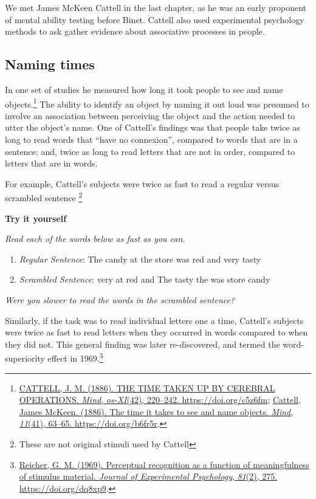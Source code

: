 \documentclass[
  oneside,
  12pt]{crumpbook}
\newenvironment{floatrightbox50}{%
  \wrapfigure{R}{.5\textwidth}%
  }{%
  \endwrapfigure}
\begin{document}
We met James McKeen Cattell in the last chapter, as he was an early proponent of mental ability testing before Binet. Cattell also used experimental psychology methods to ask gather evidence about associative processes in people.

\hypertarget{naming-times}{%
\subsection{Naming times}\label{naming-times}}

In one set of studies he measured how long it took people to see and name objects.\footnote{\protect\hyperlink{ref-cattellTIMETAKENCEREBRAL1886}{CATTELL, J. M. (1886). {THE TIME TAKEN UP BY CEREBRAL OPERATIONS}. \emph{Mind}, \emph{os-XI}(42), 220--242. \url{https://doi.org/c5z6fm}}; \protect\hyperlink{ref-cattellTimeItTakes1886}{Cattell, James McKeen. (1886). The time it takes to see and name objects. \emph{Mind}, \emph{11}(41), 63--65. \url{https://doi.org/b6fr5r}}.} The ability to identify an object by naming it out loud was presumed to involve an association between perceiving the object and the action needed to utter the object's name. One of Cattell's findings was that people take twice as long to read words that ``have no connexion'', compared to words that are in a sentence; and, twice as long to read letters that are not in order, compared to letters that are in words.

For example, Cattell's subjects were twice as fast to read a regular versus scrambled sentence \footnote{These are not original stimuli used by Cattell}

\begin{floatrightbox50}
\textbf{Try it yourself}

\emph{Read each of the words below as fast as you can.}

\begin{enumerate}
\def\labelenumi{\arabic{enumi}.}
\item
  \emph{Regular Sentence}: The candy at the store was red and very tasty
\item
  \emph{Scrambled Sentence}: very at red and The tasty the was store candy
\end{enumerate}

\emph{Were you slower to read the words in the scrambled sentence?}

\end{floatrightbox50}

Similarly, if the task was to read individual letters one a time, Cattell's subjects were twice as fast to read letters when they occurred in words compared to when they did not. This general finding was later re-discovered, and termed the word-superiority effect in 1969.\footnote{\protect\hyperlink{ref-reicherPerceptualRecognitionFunction1969}{Reicher, G. M. (1969). Perceptual recognition as a function of meaningfulness of stimulus material. \emph{Journal of Experimental Psychology}, \emph{81}(2), 275. \url{https://doi.org/dq8xp9}}.}
\end{document}
